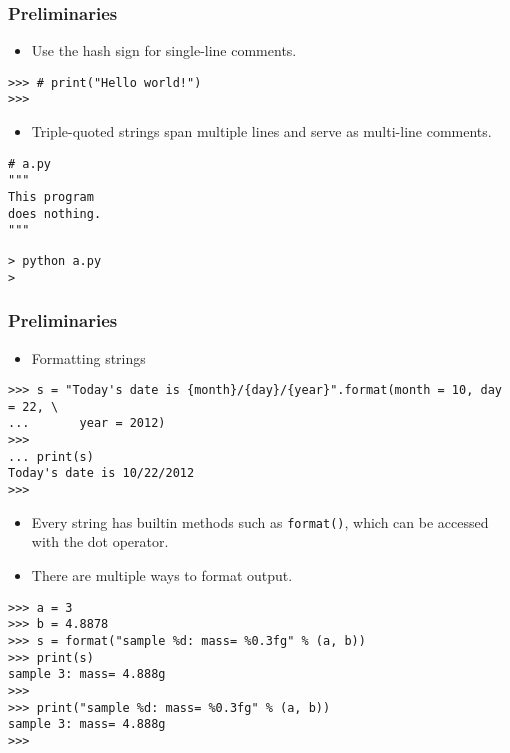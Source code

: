 \documentclass[handout]{beamer}
\numberwithin{equation}{section}
\begin{document}
\begin{frame}[fragile]
\frametitle{Preliminaries}
\begin{itemize}
\item Use the hash sign for single-line comments.
\end{itemize}

\begin{lstlisting}[name=ex]
>>> # print("Hello world!")
>>> 
\end{lstlisting}


\pause 
\begin{itemize}
\item Triple-quoted strings span multiple lines and serve as multi-line comments.
\end{itemize}

\begin{lstlisting}[name=ex]
# a.py
"""
This program
does nothing. 
"""
\end{lstlisting}

\begin{lstlisting}[name=ex]
> python a.py
>
\end{lstlisting}
\end{frame}


\begin{frame}[fragile]
\frametitle{Preliminaries}

\begin{itemize}
\item Formatting strings
\end{itemize}

\begin{lstlisting}[name=ex]
>>> s = "Today's date is {month}/{day}/{year}".format(month = 10, day = 22, \
...       year = 2012)
>>>       
... print(s)
Today's date is 10/22/2012
>>> 
\end{lstlisting}

\pause 
\begin{itemize}
\item Every string has builtin methods such as {\tt format()}, which can be accessed with the dot operator.
\pause \item There are multiple ways to format output.
\end{itemize}

\begin{lstlisting}[name=ex]
>>> a = 3
>>> b = 4.8878
>>> s = format("sample %d: mass= %0.3fg" % (a, b))
>>> print(s)
sample 3: mass= 4.888g
>>> 
>>> print("sample %d: mass= %0.3fg" % (a, b))
sample 3: mass= 4.888g
>>> 
\end{lstlisting}
\end{frame}
\end{document}
